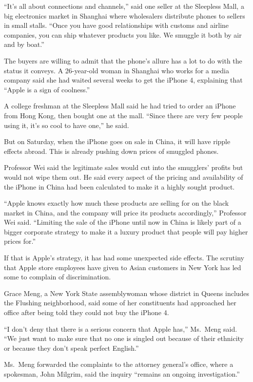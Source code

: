 ﻿\documentclass[12pt]{article}
\begin{document}
``It's all about connections and channels,'' said one seller at the Sleepless Mall, a big
electronics market in Shanghai where wholesalers distribute phones to sellers in small stalls.
``Once you have good relationships with customs and airline companies, you can ship whatever
products you like. We smuggle it both by air and by boat.''

The buyers are willing to admit that the phone's allure has a lot to do with the status it conveys.
A 26-year-old woman in Shanghai who works for a media company said she had waited several weeks to
get the iPhone 4, explaining that ``Apple is a sign of coolness.''

A college freshman at the Sleepless Mall said he had tried to order an iPhone from Hong Kong, then
bought one at the mall. ``Since there are very few people using it, it's so cool to have one,'' he
said.

But on Saturday, when the iPhone goes on sale in China, it will have ripple effects abroad. This is
already pushing down prices of smuggled phones.

Professor Wei said the legitimate sales would cut into the smugglers' profits but would not wipe
them out. He said every aspect of the pricing and availability of the iPhone in China had been
calculated to make it a highly sought product.

``Apple knows exactly how much these products are selling for on the black market in China, and the
company will price its products accordingly,'' Professor Wei said. ``Limiting the sale of the iPhone
until now in China is likely part of a bigger corporate strategy to make it a luxury product that
people will pay higher prices for.''

If that is Apple's strategy, it has had some unexpected side effects. The scrutiny that Apple store
employees have given to Asian customers in New York has led some to complain of discrimination.

Grace Meng, a New York State assemblywoman whose district in Queens includes the Flushing
neighborhood, said some of her constituents had approached her office after being told they could
not buy the iPhone 4.

``I don't deny that there is a serious concern that Apple has,'' Ms.~Meng said. ``We just want to
make sure that no one is singled out because of their ethnicity or because they don't speak perfect
English.''

Ms.~Meng forwarded the complaints to the attorney general's office, where a spokesman, John Milgrim,
said the inquiry ``remains an ongoing investigation.''



\end{document}
